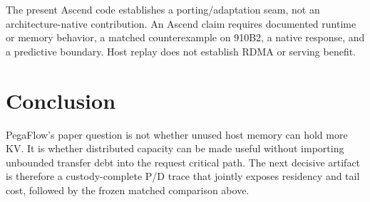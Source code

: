 \documentclass[10pt]{article}
\begin{document}
The present Ascend code establishes a porting/adaptation seam, not an
architecture-native contribution. An Ascend claim requires documented runtime
or memory behavior, a matched counterexample on 910B2, a native response, and a
predictive boundary. Host replay does not establish RDMA or serving benefit.

\section{Conclusion}

PegaFlow's paper question is not whether unused host memory can hold more KV.
It is whether distributed capacity can be made useful without importing
unbounded transfer debt into the request critical path. The next decisive
artifact is therefore a custody-complete P/D trace that jointly exposes
residency and tail cost, followed by the frozen matched comparison above.



\end{document}
